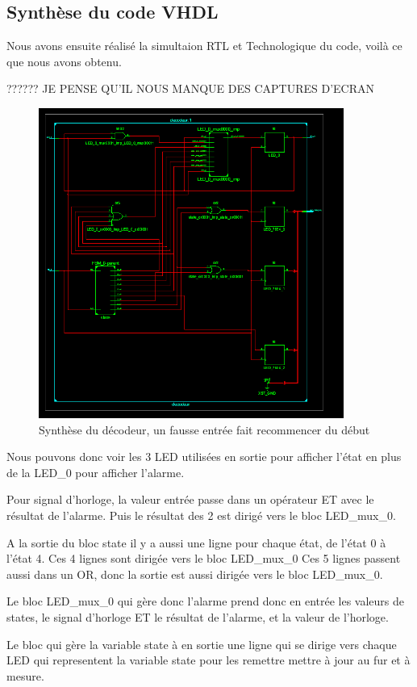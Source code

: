 \documentclass[11pt]{report}
\begin{document}
\subsection{ Synthèse du code VHDL }


Nous avons ensuite réalisé la simultaion RTL et Technologique du code, voilà ce que nous avons obtenu.

?????? JE PENSE QU'IL NOUS MANQUE DES CAPTURES D'ECRAN

\begin{figure}[!h]
\includegraphics[width=10cm]{TP02-9.PNG}
\caption{Synthèse du décodeur, un fausse entrée fait recommencer du début}
\end{figure}


Nous pouvons donc voir les 3 LED utilisées en sortie pour afficher l'état en plus de la LED\_0 pour afficher l'alarme. 

Pour signal d'horloge, la valeur entrée passe dans un opérateur ET avec le résultat de l'alarme. Puis le résultat des 2 est dirigé vers le bloc LED\_mux\_0.


A la sortie du bloc state il y a aussi une ligne pour chaque état, de l'état 0 à l'état 4. Ces 4 lignes sont dirigée vers le bloc LED\_mux\_0
Ces 5 lignes passent aussi dans un OR, donc la sortie est aussi dirigée vers le bloc LED\_mux\_0.

Le bloc LED\_mux\_0 qui gère donc l'alarme prend donc en entrée les valeurs de states, le signal d'horloge ET le résultat de l'alarme, et la valeur de l'horloge.

Le bloc qui gère la variable state à en sortie une ligne qui se dirige vers chaque LED qui representent la variable state pour les remettre mettre à jour au fur et à mesure.
\end{document}
